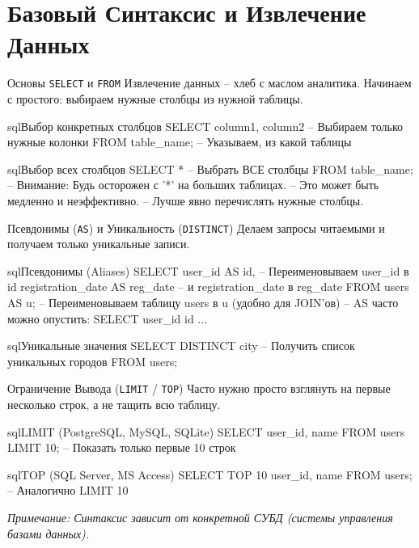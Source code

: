 
\section{Базовый Синтаксис и Извлечение Данных}

\begin{myblock}{Основы \texttt{SELECT} и \texttt{FROM}}
    Извлечение данных – хлеб с маслом аналитика. Начинаем с простого: выбираем нужные столбцы из нужной таблицы.
    \begin{codebox}{sql}{Выбор конкретных столбцов}
    SELECT column1, column2 -- Выбираем только нужные колонки
    FROM table_name;       -- Указываем, из какой таблицы
    \end{codebox}
    \begin{codebox}{sql}{Выбор всех столбцов}
    SELECT *               -- Выбрать ВСЕ столбцы
    FROM table_name;
    -- Внимание: Будь осторожен с '*' на больших таблицах.
    -- Это может быть медленно и неэффективно.
    -- Лучше явно перечислять нужные столбцы.
    \end{codebox}
\end{myblock}

\begin{textbox}{Псевдонимы (\texttt{AS}) и Уникальность (\texttt{DISTINCT})}
    Делаем запросы читаемыми и получаем только уникальные записи.
    \begin{codebox}{sql}{Псевдонимы (Aliases)}
    SELECT
        user_id AS id, -- Переименовываем user_id в id
        registration_date AS reg_date -- и registration_date в reg_date
    FROM
        users AS u; -- Переименовываем таблицу users в u (удобно для JOIN'ов)
    -- AS часто можно опустить: SELECT user_id id ...
    \end{codebox}
    \begin{codebox}{sql}{Уникальные значения}
    SELECT DISTINCT city -- Получить список уникальных городов
    FROM users;
    \end{codebox}
\end{textbox}

\begin{myblock}{Ограничение Вывода (\texttt{LIMIT} / \texttt{TOP})}
    Часто нужно просто взглянуть на первые несколько строк, а не тащить всю таблицу.
    \begin{codebox}{sql}{LIMIT (PostgreSQL, MySQL, SQLite)}
    SELECT user_id, name
    FROM users
    LIMIT 10; -- Показать только первые 10 строк
    \end{codebox}
    \begin{codebox}{sql}{TOP (SQL Server, MS Access)}
    SELECT TOP 10 user_id, name
    FROM users; -- Аналогично LIMIT 10
    \end{codebox}
    \textit{Примечание: Синтаксис зависит от конкретной СУБД (системы управления базами данных).}
\end{myblock}

